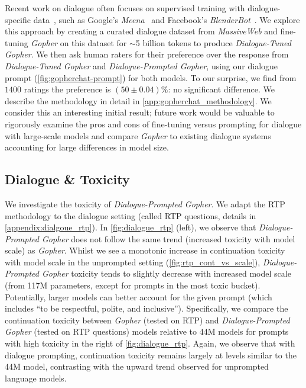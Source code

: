 Recent work on dialogue often focuses on supervised training with dialogue-specific data~\citep{chen2017survey}, such as Google's \textit{Meena}~\citep{adiwardana2020towards} and Facebook's \textit{BlenderBot}~\citep{roller2020recipes}. We explore this approach by creating a curated dialogue dataset from \textit{MassiveWeb} and fine-tuning \textit{Gopher} on this dataset for $\sim$5 billion tokens to produce \textit{Dialogue-Tuned Gopher}. We then ask human raters for their preference over the response from \textit{Dialogue-Tuned Gopher} and \textit{Dialogue-Prompted Gopher}, using our dialogue prompt (\autoref{fig:gopherchat-prompt}) for both models. To our surprise, we find from $1400$ ratings the preference is  $(50 \pm 0.04)\%$: no significant difference. We describe the methodology in detail in \autoref{app:gopherchat_methodology}. We consider this an interesting initial result; future work would be valuable to rigorously examine the pros and cons of fine-tuning versus prompting for dialogue with large-scale models and compare \textit{Gopher} to existing dialogue systems accounting for large differences in model size. 

\subsection{Dialogue \& Toxicity }

We investigate the toxicity of \textit{Dialogue-Prompted Gopher}. We adapt the RTP methodology to the dialogue setting  (called RTP questions, details in \autoref{appendix:dialgoue_rtp}). 
In \autoref{fig:dialogue_rtp} (left),  we observe that \textit{Dialogue-Prompted Gopher} does not follow the same trend (increased toxicity with model scale) as \textit{Gopher}.  
Whilst we see a monotonic increase in continuation toxicity with model scale in the unprompted setting (\autoref{fig:rtp_cont_vs_scale}), \textit{Dialogue-Prompted Gopher} toxicity tends to slightly decrease with increased model scale (from 117M parameters, except for prompts in the most toxic bucket). Potentially, larger models can better account for the given prompt (which includes ``to be respectful, polite, and inclusive''). Specifically, we compare the continuation toxicity between \textit{Gopher} (tested on RTP) and \textit{Dialogue-Prompted Gopher} (tested on RTP questions) models relative to 44M models for prompts with high toxicity in the right of  \autoref{fig:dialogue_rtp}. 
Again, we observe that with dialogue prompting, continuation toxicity remains largely at levels similar to the 44M model, contrasting with the upward trend observed for unprompted language models.

